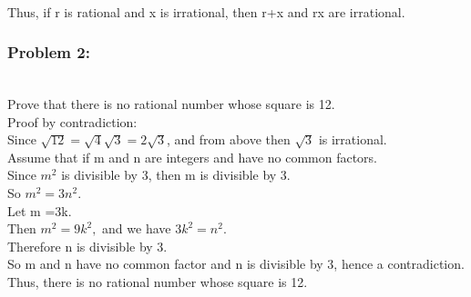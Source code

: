 \\
Thus, if r is rational and x is irrational, then r+x and rx are irrational. 

\begin{figure}[h]\end{figure} 


\newpage
\subsubsection*{Problem 2:} \\ 
Prove that there is no rational number whose square is 12. \\ 
Proof by contradiction:\\ 
Since $\sqrt{12}=\sqrt{4} \sqrt{3}= 2 \sqrt{3}$,  and from above then $\sqrt{3}$ is irrational. \\ 
Assume that if m and n are integers and have no common factors. \\ 
Since $m^2$ is divisible by 3, then m is divisible by 3. \\  
So $m^2 = 3n^2.$ \\  Let m =3k. \\ 
Then $m^2= 9k^2,$ and we have $3k^2= n^2.$ \\ 
Therefore n is divisible by 3. \\ 
So m and n have no common factor and n is divisible by 3, hence a contradiction.  
\\
Thus, there is no rational number whose square is 12.

